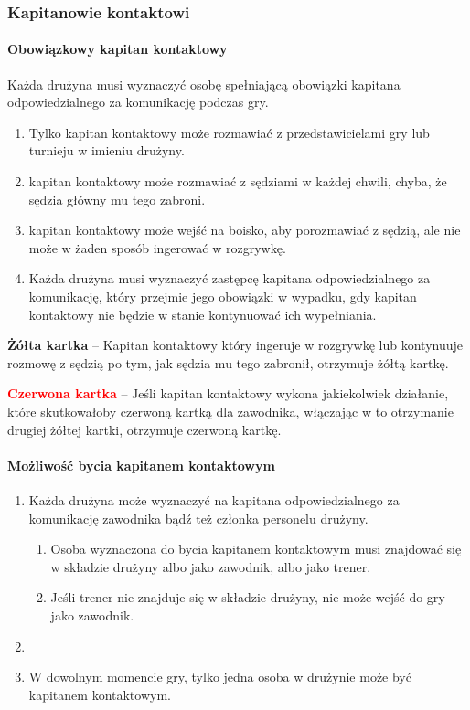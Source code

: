 \documentclass[12pt]{article}
\newcommand\redcard[1]{\bgroup\textcolor{red}{\textbf{#1}}}
\newcommand\yellowcard[1]{\bgroup\textcolor{darkyellow}{\textbf{#1}}}
\begin{document}
\subsubsection{Kapitanowie kontaktowi}

\paragraph{Obowiązkowy kapitan kontaktowy}
Każda drużyna musi wyznaczyć
osobę spełniającą obowiązki kapitana odpowiedzialnego za komunikację
podczas gry.

\begin{enumerate}
	\item Tylko kapitan kontaktowy może rozmawiać z przedstawicielami gry lub
	      turnieju w imieniu drużyny.

	\item kapitan kontaktowy może rozmawiać z sędziami w każdej chwili, chyba,
	      że sędzia główny mu tego zabroni.

	\item kapitan kontaktowy może wejść na boisko, aby porozmawiać z sędzią,
	      ale nie może w żaden sposób ingerować w rozgrywkę.

	\item Każda drużyna musi wyznaczyć zastępcę kapitana odpowiedzialnego za
	      komunikację, który przejmie jego obowiązki w wypadku, gdy kapitan
	      kontaktowy nie będzie w stanie kontynuować ich wypełniania.
\end{enumerate}

\yellowcard{Żółta kartka} -- Kapitan kontaktowy który ingeruje w rozgrywkę lub
kontynuuje rozmowę z sędzią po tym, jak sędzia mu tego zabronił,
otrzymuje żółtą kartkę.

\redcard{Czerwona kartka} -- Jeśli kapitan kontaktowy wykona jakiekolwiek
działanie, które skutkowałoby czerwoną kartką dla zawodnika, włączając w
to otrzymanie drugiej żółtej kartki, otrzymuje czerwoną kartkę.

\paragraph{Możliwość bycia kapitanem kontaktowym}

\begin{enumerate}
	\item
	      Każda drużyna może wyznaczyć na kapitana odpowiedzialnego za
	      komunikację zawodnika bądź też członka personelu drużyny.

	      \begin{enumerate}
		      \item
		            Osoba wyznaczona do bycia kapitanem kontaktowym musi znajdować się w
		            składzie drużyny albo jako zawodnik, albo jako trener.
		      \item
		            Jeśli trener nie znajduje się w składzie drużyny, nie może wejść do
		            gry jako zawodnik.
	      \end{enumerate}
	\item
	\item W dowolnym momencie gry, tylko jedna osoba w drużynie może być
	      kapitanem kontaktowym.
\end{enumerate}
\end{document}
